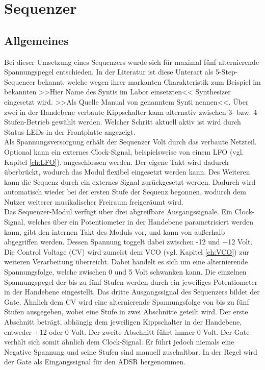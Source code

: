 \chapter{Sequenzer}
\label{ch:Sequenzer}
\section{Allgemeines}
Bei dieser Umsetzung eines Sequenzers wurde sich für maximal fünf alternierende Spannungspegel entschieden. In der Literatur ist diese Unterart als 5-Step-Sequencer bekannt, welche wegen ihrer markanten Charakteristik zum Beispiel im bekannten >>Hier Name des Syntis im Labor einsetzten<< Synthesizer eingesetzt wird. >>Als Quelle Manual von genanntem Synti nennen<<. Über zwei in der Handebene verbaute Kippschalter kann alternativ zwischen 3- bzw. 4-Stufen-Betrieb gewählt werden. Welcher Schritt aktuell aktiv ist wird durch Status-LEDs in der Frontplatte angezeigt.\\
Als Spannungsversorgung erhält der Sequenzer  Volt durch das verbaute Netzteil. Optional kann ein externes Clock-Signal, beispielsweise von einem LFO (vgl. Kapitel \ref{ch:LFO}), angeschlossen werden. Der eigene Takt wird dadurch überbrückt, wodurch das Modul flexibel eingesetzt werden kann. Des Weiteren kann die Sequenz durch ein externes Signal zurückgesetzt werden. Dadurch wird automatisch wieder bei der ersten Stufe der Sequenz begonnen, wodurch dem Nutzer weiterer musikalischer Freiraum freigeräumt wird.\\
Das Sequenzer-Modul verfügt über drei abgreifbare Ausgangssignale. Ein Clock-Signal, welches über ein Potentiometer in der Handebene parametrisiert werden kann, gibt den internen Takt des Moduls vor, und kann von außerhalb abgegriffen werden. Dessen Spannung toggelt dabei zwischen -12 und +12 Volt. Die Control Voltage (CV) wird zumeist dem VCO (vgl. Kapitel \ref{ch:VCO}) zur weiteren Verarbeitung überreicht. Dabei handelt es sich um eine alternierende Spannungsfolge, welche zwischen 0 und 5 Volt schwanken kann. Die einzelnen Spannungspegel der bis zu fünf Stufen werden durch ein jeweiliges Potentiometer in der Handebene eingestellt. Das dritte Ausgangssignal des Sequenzers bildet der Gate. Ähnlich dem CV wird eine alternierende Spannungsfolge von bis zu fünf Stufen ausgegeben, wobei eine Stufe in zwei Abschnitte geteilt wird. Der erste Abschnitt beträgt, abhängig dem jeweiligen Kippschalter in der Handebene, entweder +12 oder 0 Volt. Der zweite Abschnitt führt immer 0 Volt. Der Gate verhält sich somit ähnlich dem Clock-Signal. Er führt jedoch niemals eine Negative Spannung und seine Stufen sind manuell zuschaltbar. In der Regel wird der Gate als Eingangssignal für den ADSR hergenommen.

